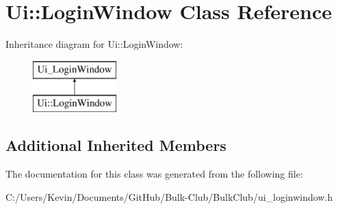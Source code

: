 \hypertarget{class_ui_1_1_login_window}{}\section{Ui\+:\+:Login\+Window Class Reference}
\label{class_ui_1_1_login_window}
Inheritance diagram for Ui\+:\+:Login\+Window\+:\begin{figure}[H]
\begin{center}
\leavevmode
\includegraphics[height=2.000000cm]{class_ui_1_1_login_window}
\end{center}
\end{figure}
\subsection*{Additional Inherited Members}


The documentation for this class was generated from the following file\+:\begin{DoxyCompactItemize}
\item 
C\+:/\+Users/\+Kevin/\+Documents/\+Git\+Hub/\+Bulk-\/\+Club/\+Bulk\+Club/ui\+\_\+loginwindow.\+h\end{DoxyCompactItemize}
